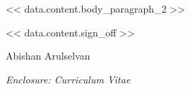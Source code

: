 \documentclass[letterpaper,11pt]{article}
\begin{document}
<< data.content.body_paragraph_2 >>

\vspace{2.5em}

\nopagebreak
{\setlength{\parindent}{0pt}
<< data.content.sign_off >>

\vspace{1.5em} %

Abishan Arulselvan
\par}

\vspace{3em}

{\setlength{\parindent}{0pt} \textit{Enclosure: Curriculum Vitae} \par}
\end{document}
